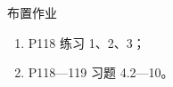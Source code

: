 \documentclass[aspectratio=169,11pt,t,fleqn]{ctexbeamer}
\begin{document}
\begin{frame}{布置作业}
  \begin{summarybox}[作业：]
    \begin{enumerate}[(1)]
      \item P118 练习 1、2、3；
      \item P118---119 习题 4.2---10。
    \end{enumerate}
  \end{summarybox}
\end{frame}
\end{document}
